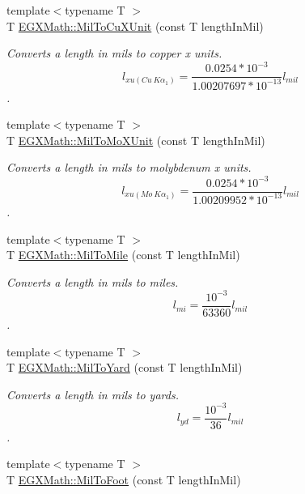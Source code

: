 \begin{DoxyCompactItemize}
{\footnotesize template$<$typename T $>$ }\\T \mbox{\hyperlink{group___e_g_x_math-_conversions-_length_conversions-_imperial-_mil-_non-_s_i_ga92f713e3dddc0a45caa3fc6b5e8ca442}{E\+G\+X\+Math\+::\+Mil\+To\+Cu\+X\+Unit}} (const T length\+In\+Mil)
\begin{DoxyCompactList}\small\item\em Converts a length in mils to copper x units. \[ l_{xu(Cu\ K\alpha_1)}=\frac{0.0254 * 10^{-3}}{1.00207697*10^{-13}} l_{mil}\]. \end{DoxyCompactList}\item 
{\footnotesize template$<$typename T $>$ }\\T \mbox{\hyperlink{group___e_g_x_math-_conversions-_length_conversions-_imperial-_mil-_non-_s_i_ga673efde012cc982641b2eb1266f88f3a}{E\+G\+X\+Math\+::\+Mil\+To\+Mo\+X\+Unit}} (const T length\+In\+Mil)
\begin{DoxyCompactList}\small\item\em Converts a length in mils to molybdenum x units. \[ l_{xu(Mo\ K\alpha_1)}=\frac{0.0254 * 10^{-3}}{1.00209952*10^{-13}} l_{mil}\]. \end{DoxyCompactList}\item 
{\footnotesize template$<$typename T $>$ }\\T \mbox{\hyperlink{group___e_g_x_math-_conversions-_length_conversions-_imperial-_mil-_imperial_ga297cf60ff93d053d0fc2f6536b2b5681}{E\+G\+X\+Math\+::\+Mil\+To\+Mile}} (const T length\+In\+Mil)
\begin{DoxyCompactList}\small\item\em Converts a length in mils to miles. \[ l_{mi}=\frac{10^{-3}}{63360} l_{mil} \]. \end{DoxyCompactList}\item 
{\footnotesize template$<$typename T $>$ }\\T \mbox{\hyperlink{group___e_g_x_math-_conversions-_length_conversions-_imperial-_mil-_imperial_gade02edc43d3b604eead1bd825063df51}{E\+G\+X\+Math\+::\+Mil\+To\+Yard}} (const T length\+In\+Mil)
\begin{DoxyCompactList}\small\item\em Converts a length in mils to yards. \[ l_{yd}= \frac{10^{-3}}{36} l_{mil} \]. \end{DoxyCompactList}\item 
{\footnotesize template$<$typename T $>$ }\\T \mbox{\hyperlink{group___e_g_x_math-_conversions-_length_conversions-_imperial-_mil-_imperial_ga713e0647ca6e88ca4700e36c896fd276}{E\+G\+X\+Math\+::\+Mil\+To\+Foot}} (const T length\+In\+Mil)

\end{DoxyCompactItemize}
